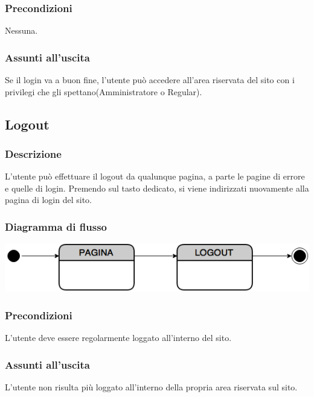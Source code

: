 \documentclass[a4paper,12pt]{article}
\begin{document}
\subsubsection{Precondizioni}
Nessuna.
\subsubsection{Assunti all'uscita}
Se il login va a buon fine, l'utente può accedere all'area riservata del sito con i privilegi che gli spettano(Amministratore o Regular).

\pagebreak

\subsection{Logout}
\subsubsection{Descrizione}
L'utente può effettuare il logout da qualunque pagina, a parte le pagine di errore e quelle di login. Premendo sul tasto dedicato, si viene indirizzati nuovamente alla pagina di login del sito.
\subsubsection{Diagramma di flusso}

\begin{center}
\includegraphics[scale=0.65]{Logout.png}
\end{center}
\subsubsection{Precondizioni}
L'utente deve essere regolarmente loggato all'interno del sito.
\subsubsection{Assunti all'uscita}
L'utente non risulta più loggato all'interno della propria area riservata sul sito.

\pagebreak
\end{document}
